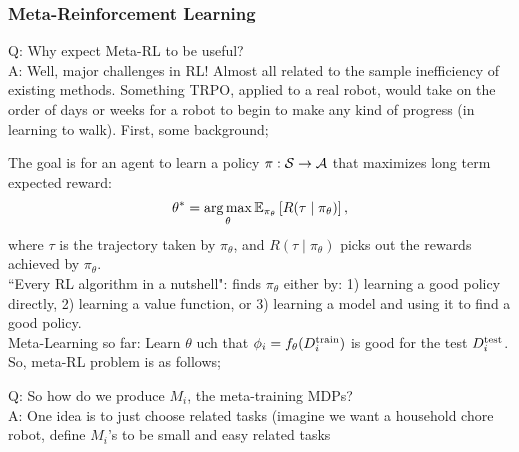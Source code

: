 \subsubsection{Meta-Reinforcement Learning}

Q: Why expect Meta-RL to be useful? \\

A: Well, major challenges in RL! Almost all related to the sample inefficiency of existing methods. Something TRPO, applied to a real robot, would take on the order of days or weeks for a robot to begin to make any kind of progress (in learning to walk). First, some background;\\


The goal is for an agent to learn a policy $\pi : \mathcal{S} \rightarrow \mathcal{A}$ that maximizes long term expected reward:
\begin{align}
\theta^* = \operatorname*{arg\,max}_\theta \mathbb{E}_{\pi_\theta}\left[ R(\tau \mid \pi_\theta)\right],
\end{align}
where $\tau$ is the trajectory taken by $\pi_\theta$, and $R(\tau \mid \pi_\theta)$ picks out the rewards achieved by $\pi_\theta$. \\

``Every RL algorithm in a nutshell": finds $\pi_\theta$ either by: 1) learning a good policy directly, 2) learning a value function, or 3) learning a model and using it to find a good policy. \\

Meta-Learning so far: Learn $\theta$ uch that $\phi_i = f_\theta(D_i^{\text{train}})$ is good for the test $D_i^{\text{test}}$. \\

So, meta-RL problem is as follows;

Q: So how do we produce $M_i$, the meta-training MDPs? \\
A: One idea is to just choose related tasks (imagine we want a household chore robot, define $M_i$'s to be small and easy related tasks \\

